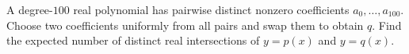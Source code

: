 A degree-$100$ real polynomial has pairwise distinct nonzero coefficients $a_0,\ldots,a_{100}$. Choose two coefficients uniformly from all pairs and swap them to obtain $q$. Find the expected number of distinct real intersections of $y=p(x)$ and $y=q(x)$.
